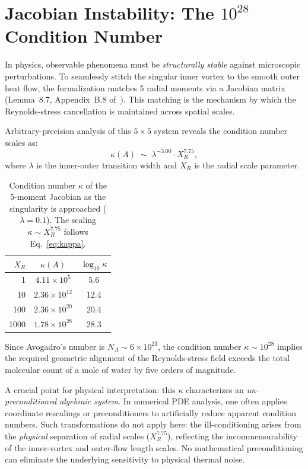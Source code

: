 \documentclass[11pt,a4paper]{article}
\begin{document}
\section{Jacobian Instability: The $10^{28}$ Condition Number}

In physics, observable phenomena must be \emph{structurally stable} against microscopic
perturbations. To seamlessly stitch the singular inner vortex to the smooth outer heat flow, the
formalization matches 5 radial moments via a Jacobian matrix (Lemma~8.7, Appendix~B.8
of~\cite{OpenAI2026}). This matching is the mechanism by which the Reynolds-stress cancellation
is maintained across spatial scales.

Arbitrary-precision analysis of this $5 \times 5$ system reveals the condition number scales as:
\begin{equation}
  \kappa(A) \;\sim\; \lambda^{-3.00} \cdot X_R^{7.75},
  \label{eq:kappa}
\end{equation}
where $\lambda$ is the inner-outer transition width and $X_R$ is the radial scale parameter.

\begin{table}[ht]
\centering
\begin{tabular}{rcc}
\toprule
$X_R$ & $\kappa(A)$ & $\log_{10} \kappa$ \\
\midrule
1    & $4.11 \times 10^5$    & 5.6  \\
10   & $2.36 \times 10^{12}$ & 12.4 \\
100  & $2.36 \times 10^{20}$ & 20.4 \\
1000 & $1.78 \times 10^{28}$ & 28.3 \\
\bottomrule
\end{tabular}
\caption{Condition number $\kappa$ of the 5-moment Jacobian as the singularity is approached
($\lambda = 0.1$). The scaling $\kappa \sim X_R^{7.75}$ follows Eq.~\eqref{eq:kappa}.}
\label{tab:condition}
\end{table}

Since Avogadro's number is $N_A \sim 6 \times 10^{23}$, the condition number $\kappa \sim 10^{28}$
implies the required geometric alignment of the Reynolds-stress field exceeds the total molecular
count of a mole of water by five orders of magnitude.

A crucial point for physical interpretation: this $\kappa$ characterizes an \emph{un-preconditioned
algebraic system}. In numerical PDE analysis, one often applies coordinate rescalings or
preconditioners to artificially reduce apparent condition numbers. Such transformations do not apply
here: the ill-conditioning arises from the \emph{physical} separation of radial scales
($X_R^{7.75}$), reflecting the incommensurability of the inner-vortex and outer-flow length
scales. No mathematical preconditioning can eliminate the underlying sensitivity to physical
thermal noise.
\end{document}
